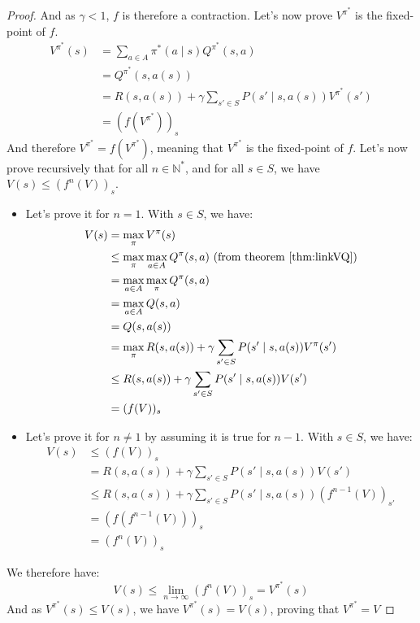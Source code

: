 \documentclass{article}
\theoremstyle{definition}
\theoremstyle{remark}
\theoremstyle{example}
\begin{document}
\begin{proof}
		And as $\gamma < 1$, $f$ is therefore a contraction. Let's now prove $V^{\pi^*}$ is the fixed-point of $f$.
		\begin{align*}
				V^{\pi^*}(s) &= \sum_{a \in A} \pi^*(a \mid s) Q^{\pi^*}(s, a)\\
							 &= Q^{\pi^*}(s, a(s))\\
							 &= R(s, a(s)) + \gamma \sum_{s' \in S} P(s' \mid s, a(s)) V^{\pi^*}(s')\\
							 &= (f(V^{\pi^*}))_s
		\end{align*}
		And therefore $V^{\pi^*} = f(V^{\pi^*})$, meaning that $V^{\pi^*}$ is the fixed-point of $f$. Let's now prove recursively that for all $n \in \mathbb{N}^*$, and for all $s \in S$, we have $V(s) \leq (f^n(V))_s$.
		\begin{itemize}
				\item Let's prove it for $n = 1$. With $s \in S$, we have:
				\begin{align*}
						V(s) &= \max_\pi V^\pi(s)\\
							 &\leq \max_\pi \max_{a \in A} Q^\pi(s, a) \text{ (from theorem \ref{thm:linkVQ})}\\
							 &= \max_{a \in A} \max_\pi Q^\pi(s, a)\\
							 &= \max_{a \in A} Q(s, a)\\
							 &= Q(s, a(s))\\
							 &= \max_\pi R(s, a(s)) + \gamma \sum_{s' \in S} P(s' \mid s, a(s)) V^\pi(s')\\
							 &\leq R(s, a(s)) + \gamma \sum_{s' \in S} P(s' \mid s, a(s))V(s')\\
							 &= (f(V))_s
				\end{align*}
				\item Let's prove it for $n \neq 1$ by assuming it is true for $n-1$. With $s \in S$, we have:
				\begin{align*}
						V(s) &\leq (f(V))_s\\
							 &= R(s, a(s)) + \gamma \sum_{s' \in S} P(s' \mid s, a(s))V(s')\\
							 &\leq R(s, a(s)) + \gamma \sum_{s' \in S} P(s' \mid s, a(s))(f^{n-1}(V))_{s'}\\
							 &= (f(f^{n-1}(V)))_s\\
							 &= (f^n(V))_s
				\end{align*}
		\end{itemize}
		
		We therefore have:
				$$V(s) \leq \lim_{n \rightarrow \infty} (f^n(V))_s = V^{\pi^*}(s)$$
		And as $V^{\pi^*}(s) \leq V(s)$, we have $V^{\pi^*}(s) = V(s)$, proving that $V^{\pi^*} = V$
\end{proof}
\end{document}
